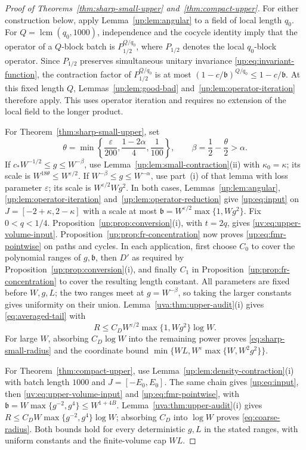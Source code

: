 \documentclass[11pt]{article}
\numberwithin{equation}{section}
\theoremstyle{remark}
\begin{document}
\begin{proof}[Proof of Theorems~\ref{thm:sharp-small-upper}
and~\ref{thm:compact-upper}]
For either construction below, apply Lemma~\ref{up:lem:angular}
to a field of local length $q_0$.
For $Q=\operatorname{lcm}(q_0,1000)$, independence and the cocycle
identity imply that the operator of a $Q$-block batch is
$P_{1/2}^{Q/q_0}$, where $P_{1/2}$ denotes the local $q_0$-block
operator. Since $P_{1/2}$ preserves simultaneous unitary invariance
\eqref{up:eq:invariant-function},
the contraction factor of $P_{1/2}^{Q/q_0}$ is at most
$(1-c/\mathfrak b)^{Q/q_0}\le1-c/\mathfrak b$.
At this fixed length $Q$, Lemmas~\ref{up:lem:good-bad}
and~\ref{up:lem:operator-iteration} therefore apply.
This uses operator iteration and requires no extension of the local
field to the longer product.

For Theorem~\ref{thm:sharp-small-upper}, set
\[
 \theta=\min\left\{\frac{\varepsilon}{200},
                \frac{1-2\alpha}{4},\frac1{100}\right\},
 \qquad \beta=\frac12-\frac\theta2>\alpha.
\]
If $c_*W^{-1/2}\le g\le W^{-\beta}$, use
Lemma~\ref{up:lem:small-contraction}\textup{(ii)} with
$\kappa_0=\kappa$; its scale is $W^{18\theta}\le W^{\varepsilon/2}$.
If $W^{-\beta}\le g\le W^{-\alpha}$, use part~\textup{(i)} of
that lemma with loss parameter $\varepsilon$; its scale is
$W^{\varepsilon/2}Wg^2$. In both cases,
Lemmas~\ref{up:lem:angular}, \ref{up:lem:operator-iteration}
and~\ref{up:lem:operator-reduction} give \eqref{up:eq:input}
on $J=[-2+\kappa,2-\kappa]$ with a scale at most
$\mathfrak b=W^{\varepsilon/2}\max\{1,Wg^2\}$.
Fix $0<q<1/4$. Proposition~\ref{up:prop:conversion}\textup{(i)},
with $t=2q$, gives \eqref{uv:eq:upper-volume-input}.
Proposition~\ref{up:prop:fr-concentration} now proves
\eqref{up:eq:fmr-pointwise} on paths and cycles.
In each application, first choose $C_0$ to cover the polynomial ranges
of $g,\mathfrak b$, then $D'$ as required by
Proposition~\ref{up:prop:conversion}\textup{(i)}, and finally $C_1$ in
Proposition~\ref{up:prop:fr-concentration} to cover the resulting length constant.
All parameters are fixed before $W,g,L$; the two ranges meet at
$g=W^{-\beta}$, so taking the larger constants gives uniformity
on their union.
Lemma~\ref{uva:thm:upper-audit}\textup{(i)} gives
\eqref{eq:averaged-tail} with
\[
 R\le C_DW^{\varepsilon/2}\max\{1,Wg^2\}\log W.
\]
For large $W$, absorbing $C_D\log W$ into the remaining power
proves \eqref{eq:sharp-small-radius} and the coordinate bound
$\min\{WL,W^\varepsilon\max\{W,W^2g^2\}\}$.

For Theorem~\ref{thm:compact-upper}, use
Lemma~\ref{up:lem:density-contraction}\textup{(i)} with batch length
$1000$ and $J=[-E_0,E_0]$. The same chain gives
\eqref{up:eq:input}, then \eqref{uv:eq:upper-volume-input}
and \eqref{up:eq:fmr-pointwise}, with
$\mathfrak b=W\max\{g^{-2},g^4\}\le W^{1+4B}$.
Lemma~\ref{uva:thm:upper-audit}\textup{(i)} gives
$R\le C_DW\max\{g^{-2},g^4\}\log W$; absorbing $C_D$ into
$\log W$ proves \eqref{eq:coarse-radius}.
Both bounds hold for every deterministic $g,L$ in the stated
ranges, with uniform constants and the finite-volume cap $WL$.
\end{proof}
\end{document}
